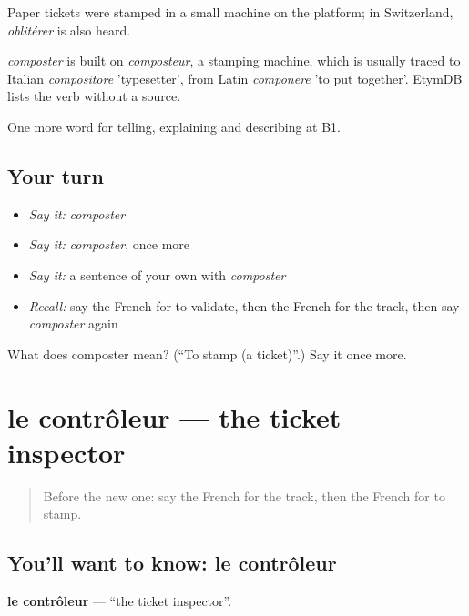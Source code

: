Paper tickets were stamped in a small machine on the platform; in Switzerland, \emph{oblitérer} is also heard.

\begin{cousinweb}
\emph{composter} is built on \emph{composteur}, a stamping machine, which is usually traced to Italian \emph{compositore} 'typesetter', from Latin \emph{compōnere} 'to put together'. EtymDB lists the verb without a source.
\end{cousinweb}

\begin{grammarlens}[title={What you've built}]
One more word for telling, explaining and describing at B1.
\end{grammarlens}

\subsection*{Your turn}
\begin{itemize}
\raggedright
  \item \emph{Say it:} \emph{composter}
  \item \emph{Say it:} \emph{composter}, once more
  \item \emph{Say it:} a sentence of your own with \emph{composter}
  \item \emph{Recall:} say the French for to validate, then the French for the track, then say \emph{composter} again
\end{itemize}

\begin{tcolorbox}[breakable,colback=teal!4,colframe=teal!35!black,title={Before you move on}]
What does composter mean? (\textquotedblleft{}To stamp (a ticket)\textquotedblright{}.) Say it once more.
\end{tcolorbox}
\section[le contrôleur]{le contrôleur — the ticket inspector}

\label{lesson:FR-C413-controleur}



\begin{quote}
Before the new one: say the French for the track, then the French for to stamp.
\end{quote}

\subsection*{You'll want to know: le contrôleur}
\textbf{le contrôleur} — \textquotedblleft{}the ticket inspector\textquotedblright{}.

